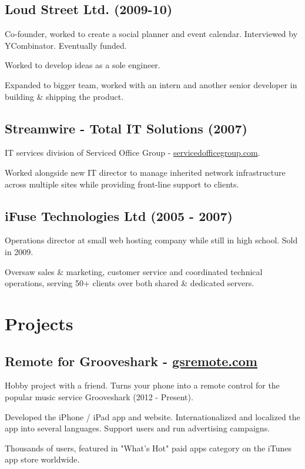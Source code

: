 \documentclass[a4paper]{article}
\renewenvironment{itemize}{
  \begin{list}{}{
    \setlength{\leftmargin}{1.5em}
  }
}{
  \end{list}
}
\begin{document}
\subsection*{Loud Street Ltd. (2009-10)}
\begin{itemize}
  \item Co-founder, worked to create a social planner and event calendar. Interviewed by YCombinator. Eventually funded.
  \item Worked to develop ideas as a sole engineer.
  \item Expanded to bigger team, worked with an intern and another senior developer in building \& shipping the product.
\end{itemize}

\subsection*{Streamwire - Total IT Solutions (2007)}
\begin{itemize}
  \item IT services division of Serviced Office Group - \href{http://servicedofficegroup.com}{servicedofficegroup.com}.
  \item Worked alongside new IT director to manage inherited network infrastructure across multiple sites while providing front-line support to clients.
\end{itemize}

\subsection*{iFuse Technologies Ltd (2005 - 2007)}
\begin{itemize}
  \item Operations director at small web hosting company while still in high school. Sold in 2009.
  \item Oversaw sales \& marketing, customer service and coordinated technical operations, serving 50+ clients over both shared \& dedicated servers.
\end{itemize}

\section*{Projects}

\subsection*{Remote for Grooveshark - \href{http://gsremote.com}{gsremote.com}}
\begin{itemize}
\item Hobby project with a friend. Turns your phone into a remote control for the popular music service Grooveshark (2012 - Present).
\item Developed the iPhone / iPad app and website. Internationalized and localized the app into several languages. Support users and run advertising campaigns.
\item Thousands of users, featured in "What's Hot" paid apps category on the iTunes app store worldwide.
\end{itemize}
\end{document}
